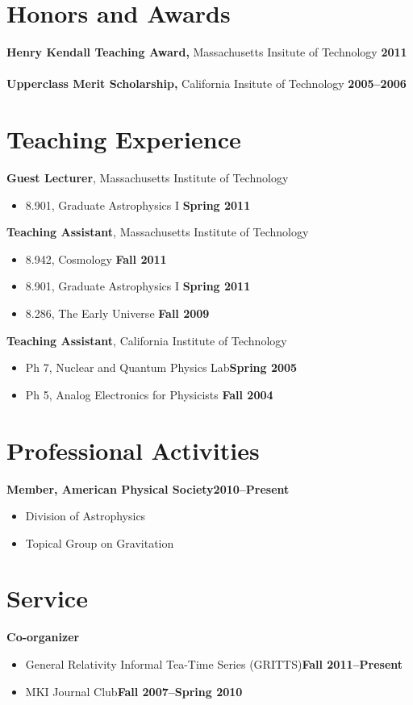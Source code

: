\documentclass[margin,line]{res}
\begin{document}
\begin{resume}
\section{\sc Honors and Awards}
{\bf Henry Kendall Teaching Award,} Massachusetts Insitute of Technology \hfill {\bf 2011}\\
\\
{\bf Upperclass Merit Scholarship,} California Insitute of Technology \hfill {\bf 2005--2006}\\

\section{\sc Teaching Experience}
{\bf Guest Lecturer}, Massachusetts Institute of Technology
\vspace*{.05in}  
\begin{itemize}
\item[ ] 8.901, Graduate Astrophysics I \hfill {\bf Spring 2011}
\end{itemize}
{\bf Teaching Assistant}, Massachusetts Institute of Technology
\vspace*{.05in}
\begin{itemize}
\item[ ] 8.942, Cosmology \hfill {\bf Fall 2011}
\item[ ] 8.901, Graduate Astrophysics I \hfill {\bf Spring 2011}
\item[ ] 8.286, The Early Universe \hfill {\bf Fall 2009}
\end{itemize}
{\bf Teaching Assistant}, California Institute of Technology
\vspace*{.05in}
\begin{itemize}
\item[ ] Ph 7, Nuclear and Quantum Physics Lab\hfill {\bf Spring 2005}
\item[ ] Ph 5, Analog Electronics for Physicists \hfill {\bf Fall 2004}
\end{itemize}



\section{\sc Professional Activities}
{\bf Member, American Physical Society}\hfill{\bf 2010--Present}
\vspace*{.05in}  
\begin{itemize}
\item[] Division of Astrophysics
\item[] Topical Group on Gravitation
\end{itemize}

\section{\sc Service}
{\bf Co-organizer}
\vspace*{.05in}
\begin{itemize}
\item[] General Relativity Informal Tea-Time Series (GRITTS)\hfill {\bf Fall 2011--Present}
\item[] MKI Journal Club\hfill {\bf Fall 2007--Spring 2010}
\end{itemize}

\end{resume}
\end{document}
